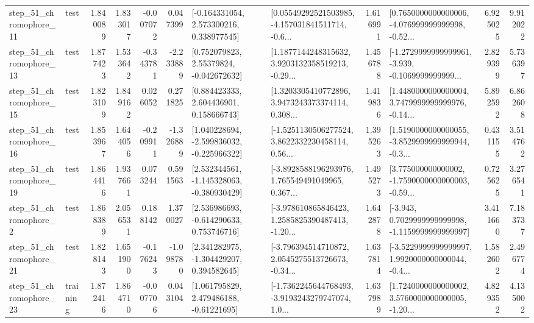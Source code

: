 \begin{tabular}{llrrrrllrlrr}
   step\_51\_chromophore\_11 &      test &      1.840089 &    1.833017 &     -0.007072 &  0.047399 &    [-0.164331054, 2.573300216, 0.338977545] &  [0.05549292521503985, -4.157031841511714, -0.6... &       1.616991 &  [0.7650000000000006, -4.076999999999998, -0.52... &            6.925025 &          9.912022 \\
   step\_51\_chromophore\_13 &      test &      1.877423 &    1.533642 &     -0.343781 & -2.233889 &     [0.752079823, 2.55379824, -0.042672632] &  [1.1877144248315632, 3.9203132358519213, -0.29... &       1.456788 &  [-1.2729999999999961, -3.939, -0.1069999999999... &            2.829399 &          5.736397 \\
   step\_51\_chromophore\_15 &      test &      1.823109 &    1.849162 &      0.026052 &  0.271825 &     [0.884423333, 2.604436901, 0.158666743] &  [1.3203305410772896, 3.9473243373374114, 0.308... &       1.419836 &  [1.4480000000000004, 3.7479999999999976, -0.14... &            5.892592 &          6.862608 \\
   step\_51\_chromophore\_16 &      test &      1.853967 &    1.644056 &     -0.209911 & -1.326889 &   [1.040228694, -2.599836032, -0.225966322] &  [-1.5251130506277524, 3.8622332230458114, 0.56... &       1.395263 &  [1.5190000000000055, -3.8529999999999944, -0.3... &            0.431155 &          3.514762 \\
   step\_51\_chromophore\_19 &      test &      1.864416 &    1.937661 &      0.073244 &  0.591563 &   [2.532344561, -1.145328063, -0.380930429] &  [-3.8928588196293976, 1.765549491049965, 0.367... &       1.495273 &  [3.775000000000002, -1.7590000000000003, -0.59... &            0.725625 &          3.276541 \\
    step\_51\_chromophore\_2 &      test &      1.868389 &    2.056531 &      0.188142 &  1.370027 &    [2.536986693, -0.614290633, 0.753746716] &  [-3.978610865846423, 1.2585825390487413, -1.20... &       1.642878 &  [-3.943, 0.7029999999999998, -1.1159999999999997] &            3.411660 &          7.183737 \\
   step\_51\_chromophore\_21 &      test &      1.828143 &    1.651900 &     -0.176243 & -1.098780 &    [2.341282975, -1.304429207, 0.394582645] &  [-3.796394514710872, 2.0545275513726673, -0.34... &       1.637814 &  [-3.5229999999999997, 1.9920000000000044, -0.4... &            1.582602 &          2.496774 \\
   step\_51\_chromophore\_23 &  training &      1.872416 &    1.864710 &     -0.007706 &  0.043104 &     [1.061795829, 2.479486188, -0.61221695] &  [-1.7362245644768493, -3.9193243279747074, 1.0... &       1.637989 &  [1.7240000000000002, 3.5760000000000005, -1.20... &            4.829352 &          4.135002 \\

\end{tabular}
